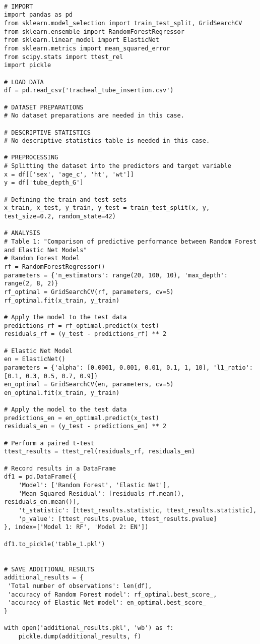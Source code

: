 \documentclass[11pt]{article}
\begin{document}
\begin{verbatim}

# IMPORT
import pandas as pd
from sklearn.model_selection import train_test_split, GridSearchCV
from sklearn.ensemble import RandomForestRegressor
from sklearn.linear_model import ElasticNet
from sklearn.metrics import mean_squared_error
from scipy.stats import ttest_rel
import pickle

# LOAD DATA
df = pd.read_csv('tracheal_tube_insertion.csv')

# DATASET PREPARATIONS
# No dataset preparations are needed in this case.

# DESCRIPTIVE STATISTICS
# No descriptive statistics table is needed in this case.

# PREPROCESSING
# Splitting the dataset into the predictors and target variable
x = df[['sex', 'age_c', 'ht', 'wt']]
y = df['tube_depth_G']

# Defining the train and test sets
x_train, x_test, y_train, y_test = train_test_split(x, y, test_size=0.2, random_state=42)

# ANALYSIS
# Table 1: "Comparison of predictive performance between Random Forest and Elastic Net Models"
# Random Forest Model
rf = RandomForestRegressor()
parameters = {'n_estimators': range(20, 100, 10), 'max_depth': range(2, 8, 2)}
rf_optimal = GridSearchCV(rf, parameters, cv=5)
rf_optimal.fit(x_train, y_train)

# Apply the model to the test data
predictions_rf = rf_optimal.predict(x_test)
residuals_rf = (y_test - predictions_rf) ** 2

# Elastic Net Model
en = ElasticNet()
parameters = {'alpha': [0.0001, 0.001, 0.01, 0.1, 1, 10], 'l1_ratio': [0.1, 0.3, 0.5, 0.7, 0.9]}
en_optimal = GridSearchCV(en, parameters, cv=5)
en_optimal.fit(x_train, y_train)

# Apply the model to the test data
predictions_en = en_optimal.predict(x_test)
residuals_en = (y_test - predictions_en) ** 2

# Perform a paired t-test
ttest_results = ttest_rel(residuals_rf, residuals_en)

# Record results in a DataFrame
df1 = pd.DataFrame({
    'Model': ['Random Forest', 'Elastic Net'],
    'Mean Squared Residual': [residuals_rf.mean(), residuals_en.mean()],
    't_statistic': [ttest_results.statistic, ttest_results.statistic],
    'p_value': [ttest_results.pvalue, ttest_results.pvalue]
}, index=['Model 1: RF', 'Model 2: EN'])

df1.to_pickle('table_1.pkl')


# SAVE ADDITIONAL RESULTS
additional_results = {
 'Total number of observations': len(df), 
 'accuracy of Random Forest model': rf_optimal.best_score_,
 'accuracy of Elastic Net model': en_optimal.best_score_
}

with open('additional_results.pkl', 'wb') as f:
    pickle.dump(additional_results, f)


\end{verbatim}
\end{document}
